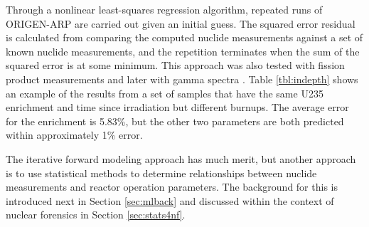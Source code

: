 Through a nonlinear least-squares regression algorithm, repeated runs of
\gls{ORIGEN-ARP} are carried out given an initial guess. The squared error
residual is calculated from comparing the computed nuclide measurements against
a set of known nuclide measurements, and the repetition terminates when the sum
of the squared error is at some minimum.  \cite{weber_2006} This approach was
also tested with fission product measurements \cite{weber_2010} and later with
gamma spectra \cite{weber_2011}. Table \ref{tbl:indepth} shows an example of
the results from a set of samples that have the same \gls{U235} enrichment and
time since irradiation but different burnups.  The average error for the
enrichment is 5.83\%, but the other two parameters are both predicted within
approximately 1\% error. 

The iterative forward modeling approach has much merit, but another approach is
to use statistical methods to determine relationships between nuclide
measurements and reactor operation parameters. The background for this is
introduced next in Section \ref{sec:mlback} and discussed within the context of
nuclear forensics in Section \ref{sec:stats4nf}.

